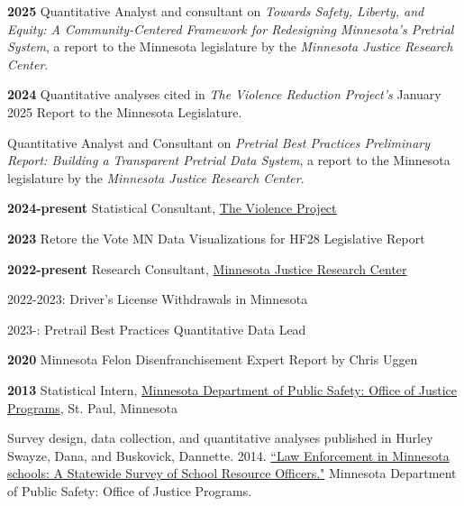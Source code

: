 \documentclass[letterpaper]{article}
\newenvironment{publist}{%
  \begin{list}{}{%
    \setlength{\leftmargin}{0cm}   %
    \setlength{\labelwidth}{2cm}     %
    \setlength{\labelsep}{0.5cm}     %
  }%
}{%
  \end{list}%
}
\renewenvironment{itemize}{
  \begin{list}{}{
    \setlength{\leftmargin}{1.5em}
  }
}{
  \end{list}
}
\begin{document}
\begin{publist}

\item[\textbf{2025}] Quantitative Analyst and consultant on \textit{Towards Safety, Liberty, and Equity: A Community-Centered Framework for Redesigning Minnesota's Pretrial System}, a report to the Minnesota legislature by the \textit{Minnesota Justice Research Center}. 
\item[\textbf{2024}] Quantitative analyses cited in \textit{The Violence Reduction Project's} January 2025 Report to the Minnesota Legislature.  
\item Quantitative Analyst and Consultant on \textit{Pretrial Best Practices Preliminary Report: Building a Transparent Pretrial Data System}, a report to the Minnesota legislature by the \textit{Minnesota Justice Research Center}.
\item[\textbf{2024-present}] Statistical Consultant, \href{https://www.theviolenceproject.org/}{The Violence Project}
\item[\textbf{2023}] Retore the Vote MN Data Visualizations for HF28 Legislative Report
\item[\textbf{2022-present}] Research Consultant, \href{https://www.mnjrc.org/about-us}{Minnesota Justice Research Center}

\begin{itemize}

\item 2022-2023: Driver's License Withdrawals in Minnesota
\item 2023-: Pretrail Best Practices Quantitative Data Lead

\end{itemize}

\item[\textbf{2020}] Minnesota Felon Disenfranchisement Expert Report by Chris Uggen 

\item[\textbf{2013}] Statistical Intern, \href{https://dps.mn.gov/divisions/ojp/statistical-analysis-center/Pages/default.aspx}{Minnesota Department of Public Safety: Office of Justice Programs}, St. Paul, Minnesota
\begin{itemize}
	\item Survey design, data collection, and quantitative analyses published in Hurley Swayze, Dana, and  Buskovick, Dannette. 2014. \href{https://dps.mn.gov/divisions/ojp/forms-documents/Documents/SRO20REPORT.pdf}{``Law Enforcement in Minnesota schools: A Statewide Survey of School Resource Officers."} Minnesota Department of Public Safety: Office of Justice Programs.
\end{itemize}

\end{publist}
\end{document}
